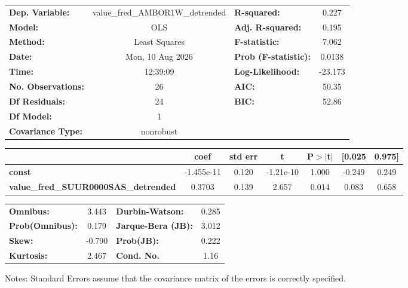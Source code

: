 \begin{center}
\begin{tabular}{lclc}
\toprule
\textbf{Dep. Variable:}                      & value\_fred\_AMBOR1W\_detrended & \textbf{  R-squared:         } &     0.227   \\
\textbf{Model:}                              &               OLS               & \textbf{  Adj. R-squared:    } &     0.195   \\
\textbf{Method:}                             &          Least Squares          & \textbf{  F-statistic:       } &     7.062   \\
\textbf{Date:}                               &         Mon, 10 Aug 2026        & \textbf{  Prob (F-statistic):} &   0.0138    \\
\textbf{Time:}                               &             12:39:09            & \textbf{  Log-Likelihood:    } &   -23.173   \\
\textbf{No. Observations:}                   &                  26             & \textbf{  AIC:               } &     50.35   \\
\textbf{Df Residuals:}                       &                  24             & \textbf{  BIC:               } &     52.86   \\
\textbf{Df Model:}                           &                   1             & \textbf{                     } &             \\
\textbf{Covariance Type:}                    &            nonrobust            & \textbf{                     } &             \\
\bottomrule
\end{tabular}
\begin{tabular}{lcccccc}
                                             & \textbf{coef} & \textbf{std err} & \textbf{t} & \textbf{P$> |$t$|$} & \textbf{[0.025} & \textbf{0.975]}  \\
\midrule
\textbf{const}                               &   -1.455e-11  &        0.120     & -1.21e-10  &         1.000        &       -0.249    &        0.249     \\
\textbf{value\_fred\_SUUR0000SAS\_detrended} &       0.3703  &        0.139     &     2.657  &         0.014        &        0.083    &        0.658     \\
\bottomrule
\end{tabular}
\begin{tabular}{lclc}
\textbf{Omnibus:}       &  3.443 & \textbf{  Durbin-Watson:     } &    0.285  \\
\textbf{Prob(Omnibus):} &  0.179 & \textbf{  Jarque-Bera (JB):  } &    3.012  \\
\textbf{Skew:}          & -0.790 & \textbf{  Prob(JB):          } &    0.222  \\
\textbf{Kurtosis:}      &  2.467 & \textbf{  Cond. No.          } &     1.16  \\
\bottomrule
\end{tabular}
\end{center}

Notes: \newline
 [1] Standard Errors assume that the covariance matrix of the errors is correctly specified.